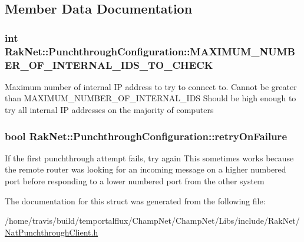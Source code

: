 \subsection{Member Data Documentation}
\hypertarget{struct_rak_net_1_1_punchthrough_configuration_acd74cae9566a57538e8500fcc8dd1be1}{
\subsubsection[{M\-A\-X\-I\-M\-U\-M\-\_\-\-N\-U\-M\-B\-E\-R\-\_\-\-O\-F\-\_\-\-I\-N\-T\-E\-R\-N\-A\-L\-\_\-\-I\-D\-S\-\_\-\-T\-O\-\_\-\-C\-H\-E\-C\-K}]{\setlength{\rightskip}{0pt plus 5cm}int Rak\-Net\-::\-Punchthrough\-Configuration\-::\-M\-A\-X\-I\-M\-U\-M\-\_\-\-N\-U\-M\-B\-E\-R\-\_\-\-O\-F\-\_\-\-I\-N\-T\-E\-R\-N\-A\-L\-\_\-\-I\-D\-S\-\_\-\-T\-O\-\_\-\-C\-H\-E\-C\-K}}\label{struct_rak_net_1_1_punchthrough_configuration_acd74cae9566a57538e8500fcc8dd1be1}
Maximum number of internal I\-P address to try to connect to. Cannot be greater than M\-A\-X\-I\-M\-U\-M\-\_\-\-N\-U\-M\-B\-E\-R\-\_\-\-O\-F\-\_\-\-I\-N\-T\-E\-R\-N\-A\-L\-\_\-\-I\-D\-S Should be high enough to try all internal I\-P addresses on the majority of computers \hypertarget{struct_rak_net_1_1_punchthrough_configuration_ad890c91fe986c80143c170d26bcddd89}{
\subsubsection[{retry\-On\-Failure}]{\setlength{\rightskip}{0pt plus 5cm}bool Rak\-Net\-::\-Punchthrough\-Configuration\-::retry\-On\-Failure}}\label{struct_rak_net_1_1_punchthrough_configuration_ad890c91fe986c80143c170d26bcddd89}
If the first punchthrough attempt fails, try again This sometimes works because the remote router was looking for an incoming message on a higher numbered port before responding to a lower numbered port from the other system 

The documentation for this struct was generated from the following file\-:\begin{DoxyCompactItemize}
\item 
/home/travis/build/temportalflux/\-Champ\-Net/\-Champ\-Net/\-Libs/include/\-Rak\-Net/\hyperlink{_nat_punchthrough_client_8h}{Nat\-Punchthrough\-Client.\-h}\end{DoxyCompactItemize}
